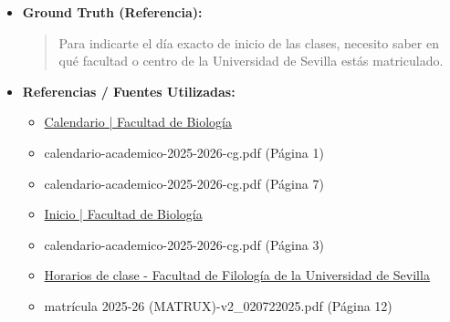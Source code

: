 \documentclass[12pt,a4paper,oneside]{report}
\begin{document}
\begin{itemize}
\begin{itemize}
\begin{quote}
Según el calendario académico, el inicio de las clases puede variar dependiendo del tipo de estudios y la facultad a la que pertenezcas. En general, el plazo para la matrícula ordinaria para estudiantes que continúan en los mismos estudios es del 9 de julio al 31 de julio de 2025 y del 1 de septiembre al 5 de septiembre de 2025. Sin embargo, el inicio de las clases puede ser anterior a estas fechas.

Para saber con certeza cuándo empiezan las clases en tu facultad, necesitaría saber qué tipo de estudios estás realizando (grado o máster) y en qué facultad te encuentras matriculado.

¿Cuál es el tipo de estudios que estás realizando (grado o máster)?
                \end{quote}
          \item \textbf{{Ground Truth (Referencia):}} \\
                \begin{quote}
Para indicarte el día exacto de inicio de las clases, necesito saber en qué facultad o centro de la Universidad de Sevilla estás matriculado.
                \end{quote}
          \item \textbf{{Referencias / Fuentes Utilizadas:}} \\
                \begin{itemize}
                  \item \href{https://biologia.us.es/es/estudios/calendario}{Calendario | Facultad de Biología}
                  \item calendario-academico-2025-2026-cg.pdf (Página 1)
                  \item calendario-academico-2025-2026-cg.pdf (Página 7)
                  \item \href{https://biologia.us.es/}{Inicio | Facultad de Biología}
                  \item calendario-academico-2025-2026-cg.pdf (Página 3)
                  \item \href{https://filologia.us.es/horarios-de-clase/}{Horarios de clase - Facultad de Filología de la Universidad de Sevilla}
                  \item matrícula 2025-26 (MATRUX)-v2\_020722025.pdf (Página 12)
                \end{itemize}
        \end{itemize}

  
\end{itemize}
\end{document}
